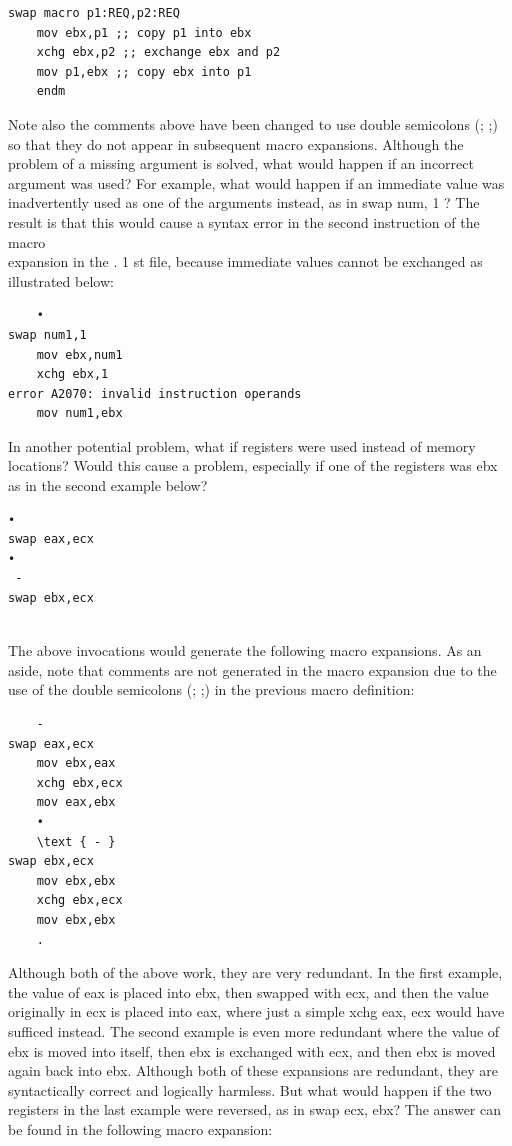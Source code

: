 \documentclass[10pt]{book}
\begin{document}
\begin{verbatim}
swap macro p1:REQ,p2:REQ
    mov ebx,p1 ;; copy p1 into ebx
    xchg ebx,p2 ;; exchange ebx and p2
    mov p1,ebx ;; copy ebx into p1
    endm
\end{verbatim}

Note also the comments above have been changed to use double semicolons (; ;) so that they do not appear in subsequent macro expansions. Although the problem of a missing argument is solved, what would happen if an incorrect argument was used? For example, what would happen if an immediate value was inadvertently used as one of the arguments instead, as in swap num, 1 ? The result is that this would cause a syntax error in the second instruction of the macro\\
expansion in the . 1 st file, because immediate values cannot be exchanged as illustrated below:


\begin{verbatim}
    •
swap num1,1
    mov ebx,num1
    xchg ebx,1
error A2070: invalid instruction operands
    mov num1,ebx
\end{verbatim}

In another potential problem, what if registers were used instead of memory locations? Would this cause a problem, especially if one of the registers was ebx as in the second example below?

\begin{verbatim}
•
swap eax,ecx
•
 -
swap ebx,ecx
  
\end{verbatim}

The above invocations would generate the following macro expansions. As an aside, note that comments are not generated in the macro expansion due to the use of the double semicolons (; ;) in the previous macro definition:

\begin{verbatim}
    -
swap eax,ecx
    mov ebx,eax
    xchg ebx,ecx
    mov eax,ebx
    •
    \text { - }
swap ebx,ecx
    mov ebx,ebx
    xchg ebx,ecx
    mov ebx,ebx
    .
\end{verbatim}

Although both of the above work, they are very redundant. In the first example, the value of eax is placed into ebx, then swapped with ecx, and then the value originally in ecx is placed into eax, where just a simple xchg eax, ecx would have sufficed instead. The second example is even more redundant where the value of ebx is moved into itself, then ebx is exchanged with ecx, and then ebx is moved again back into ebx. Although both of these expansions are redundant, they are syntactically correct and logically harmless. But what would happen if the two registers in the last example were reversed, as in swap ecx, ebx? The answer can be found in the following macro expansion:
\end{document}
